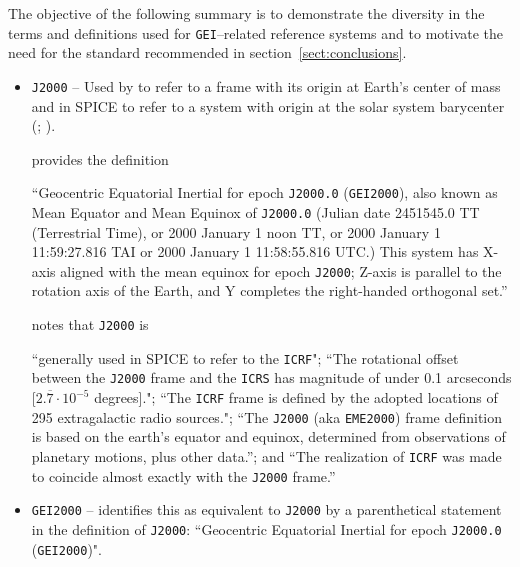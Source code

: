 \documentclass[draft]{agujournal2019}
\begin{document}
The objective of the following summary is to demonstrate the diversity in the terms and definitions used for \texttt{GEI}--related reference systems and to motivate the need for the standard recommended in section~\ref{sect:conclusions}.


\begin{itemize}
    \parskip 0.1in 

    \item \texttt{J2000} -- Used by  to refer to a frame with its origin at Earth's center of mass and in SPICE to refer to a system with origin at the solar system barycenter (; ).
    
      provides the definition
     
     ``Geocentric Equatorial Inertial for epoch \texttt{J2000.0} (\texttt{GEI2000}), also known as Mean Equator and Mean Equinox of \texttt{J2000.0} (Julian date 2451545.0 TT (Terrestrial Time), or 2000 January 1 noon TT, or 2000 January 1 11:59:27.816 TAI or 2000 January 1 11:58:55.816 UTC.) This system has X-axis aligned with the mean equinox for epoch \texttt{J2000}; Z-axis is parallel to the rotation axis of the Earth, and Y completes the right-handed orthogonal set.''


     notes that \texttt{J2000} is
    
    ``generally used in SPICE to refer to the \texttt{ICRF}"; ``The rotational offset between the \texttt{J2000} frame and the \texttt{ICRS} has magnitude of under 0.1 arcseconds [$2.\overline{7}\cdot 10^{-5}$ degrees]."; ``The \texttt{ICRF} frame is defined by the adopted locations of 295 extragalactic radio sources."; ``The \texttt{J2000} (aka \texttt{EME2000}) frame definition is based on the earth’s equator and equinox, determined from observations of planetary motions, plus other data.''; and ``The realization of \texttt{ICRF} was made to coincide almost exactly with the \texttt{J2000} frame.'' 



    \item \texttt{GEI2000} --  identifies this as equivalent to \texttt{J2000} by a parenthetical statement in the definition of \texttt{J2000}: ``Geocentric Equatorial Inertial for epoch \texttt{J2000.0} (\texttt{GEI2000})".


\end{itemize}
\end{document}
